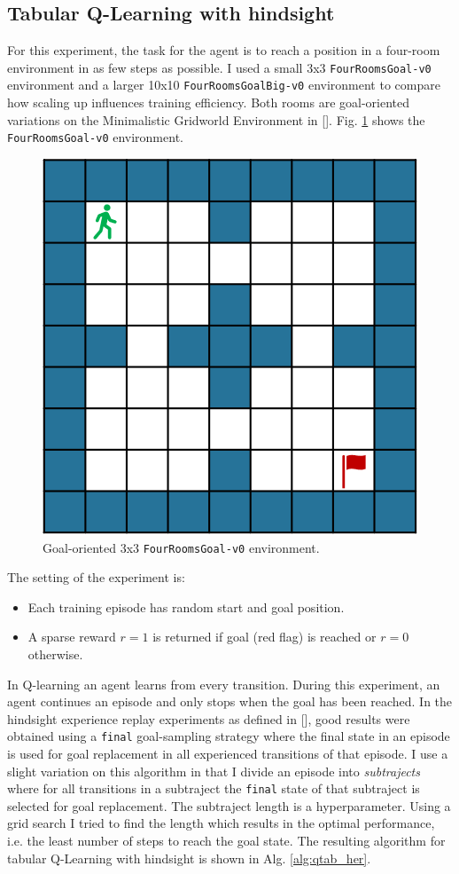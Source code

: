 \documentclass[conference]{IEEEtran}
\begin{document}
\subsection{Tabular Q-Learning with hindsight} \label{subsec:exp_tab_her}
For this experiment, the task for the agent is to reach a position in a four-room environment in as few steps as possible. I used a small 3x3 \texttt{FourRoomsGoal-v0} environment and a larger 10x10 \texttt{FourRoomsGoalBig-v0} environment to compare how scaling up influences training efficiency. Both rooms are goal-oriented variations on the Minimalistic Gridworld Environment in [\cite{gym_minigrid}]. Fig. \ref{fig:tabular_fourroomsgoal_env} shows the \texttt{FourRoomsGoal-v0} environment.
\begin{figure}[ht]
\centering
\includegraphics[width=0.5\columnwidth]{img/FourRoomsGoal-v0.png}
\caption{Goal-oriented 3x3 \texttt{FourRoomsGoal-v0} environment.}
\label{fig:tabular_fourroomsgoal_env}
\end{figure}
The setting of the experiment is:
\begin{itemize}
    \item Each training episode has random start and goal position.
    \item A sparse reward $r = 1$ is returned if goal (red flag) is reached or $r = 0$ otherwise.
\end{itemize}
In Q-learning an agent learns from every transition. During this experiment, an agent continues an episode and only stops when the goal has been reached.
In the hindsight experience replay experiments as defined in [\cite{andrychowicz2017hindsight}], good results were obtained using a \texttt{final} goal-sampling strategy where the final state in an episode is used for goal replacement in all experienced transitions of that episode. I use a slight variation on this algorithm in that I divide an episode into \textit{subtrajects} where for all transitions in a subtraject the \texttt{final} state of that subtraject is selected for goal replacement. The subtraject length is a hyperparameter. Using a grid search I tried to find the length which results in the optimal performance, i.e. the least number of steps to reach the goal state. The resulting algorithm for tabular Q-Learning with hindsight is shown in Alg. \ref{alg:qtab_her}.
\end{document}
